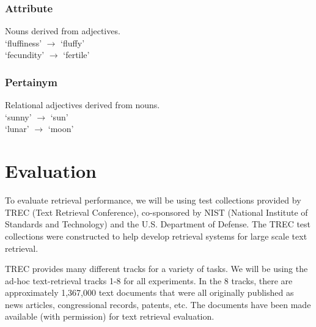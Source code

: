 \subsubsection{Attribute}
Nouns derived from adjectives. \\
`fluffiness' $\rightarrow$ `fluffy' \\
`fecundity' $\rightarrow$ `fertile' 

\subsubsection{Pertainym}
Relational adjectives derived from nouns. \\
`sunny' $\rightarrow$ `sun' \\
`lunar' $\rightarrow$ `moon'























\section{Evaluation}

To evaluate retrieval performance, we will be using test collections provided by TREC (Text Retrieval Conference), co-sponsored by NIST (National Institute of Standards and Technology) and the U.S. Department of Defense. The TREC test collections were constructed to help develop retrieval systems for large scale text retrieval.

TREC provides many different tracks for a variety of tasks. We will be using the ad-hoc text-retrieval tracks 1-8 for all experiments. In the 8 tracks, there are approximately 1,367,000 text documents that were all originally published as news articles, congressional records, patents, etc. The documents have been made available (with permission) for text retrieval evaluation.

